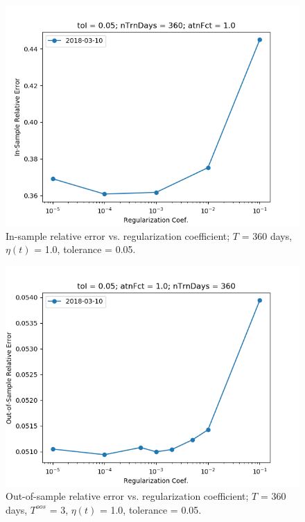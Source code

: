 \documentclass{article}
\begin{document}
\begin{figure}
\includegraphics[scale=0.9,bb=0 0 640 480]{figures/regCoef-sensitivity-error.png}
\caption{In-sample relative error vs. regularization coefficient; $T$
  = 360 days, $\eta(t)$ = 1.0, tolerance = 0.05.}
\label{fig:regCoef-sensitivity-error}
\end{figure}

\begin{figure}
\includegraphics[scale=0.9,bb=0 0 640 480]{figures/regCoef-sensitivity-oos-error.png}
\caption{Out-of-sample relative error vs. regularization coefficient;
  $T$ = 360 days, $T^{oos}$ = 3, $\eta(t)$ = 1.0, tolerance = 0.05.}
\label{fig:regCoef-sensitivity-oos-error}
\end{figure}
\end{document}
